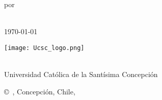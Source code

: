 \pagestyle{empty}

\begin{titlepage}
        \begin{center}
        \vspace*{1.0cm}

        \Huge
        {\bf \thesistitlecoverpage }

        \vspace*{1.0cm}

        \normalsize
        por \\

        \vspace*{1.0cm}

        \Large
        \thesisauthor \\
        \monthyeardate\today 

        \vspace*{3.0cm}

        \normalsize
        \texttt{[image: Ucsc\_logo.png]}

        \vspace*{2.0cm}

        \academicunit\\
        Universidad Católica de la Santísima Concepción\\

        \vspace*{1.0cm}

        \copyright~\thesisauthor, Concepción, Chile, \graduationyear\\
        \end{center}
\end{titlepage}

\pagestyle{plain}
\setcounter{page}{2}

\cleardoublepage %
